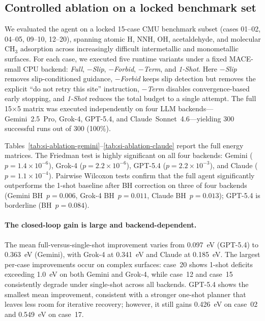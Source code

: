 \subsection{Controlled ablation on a locked benchmark set}

We evaluated the agent on a locked 15-case CMU benchmark subset (cases 01--02, 04--05, 09--10, 12--20), spanning atomic H, NNH, OH, acetaldehyde, and molecular CH$_3$ adsorption across increasingly difficult intermetallic and monometallic surfaces.
For each case, we executed five runtime variants under a fixed MACE-small CPU backend: \textit{Full}, \textit{$-$Slip}, \textit{$-$Forbid}, \textit{$-$Term}, and \textit{1-Shot}.
Here \textit{$-$Slip} removes slip-conditioned guidance, \textit{$-$Forbid} keeps slip detection but removes the explicit ``do not retry this site'' instruction, \textit{$-$Term} disables convergence-based early stopping, and \textit{1-Shot} reduces the total budget to a single attempt.
The full 15$\times$5 matrix was executed independently on four LLM backends---Gemini~2.5~Pro, Grok-4, GPT-5.4, and Claude~Sonnet~4.6---yielding 300 successful runs out of 300 (100\%).



Tables~\ref{tab:si-ablation-gemini}--\ref{tab:si-ablation-claude} report the full energy matrices.
The Friedman test is highly significant on all four backends: Gemini ($p = 1.4 \times 10^{-6}$), Grok-4 ($p = 2.2 \times 10^{-6}$), GPT-5.4 ($p = 2.2 \times 10^{-3}$), and Claude ($p = 1.1 \times 10^{-4}$).
Pairwise Wilcoxon tests confirm that the full agent significantly outperforms the 1-shot baseline after BH correction on three of four backends (Gemini BH~$p = 0.006$, Grok-4 BH~$p = 0.011$, Claude BH~$p = 0.013$); GPT-5.4 is borderline (BH~$p = 0.084$).

\paragraph{The closed-loop gain is large and backend-dependent.}
The mean full-versus-single-shot improvement varies from 0.097~eV (GPT-5.4) to 0.363~eV (Gemini), with Grok-4 at 0.341~eV and Claude at 0.185~eV.
The largest per-case improvements occur on complex surfaces: case~20 shows 1-shot deficits exceeding 1.0~eV on both Gemini and Grok-4, while case~12 and case~15 consistently degrade under single-shot across all backends.
GPT-5.4 shows the smallest mean improvement, consistent with a stronger one-shot planner that leaves less room for iterative recovery; however, it still gains 0.426~eV on case~02 and 0.549~eV on case~17.

